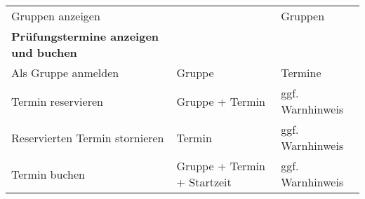 \documentclass[]{article}
\begin{document}
\begin{longtable}[]{@{}lll@{}}
\begin{minipage}[t]{0.40\columnwidth}
Gruppen anzeigen\strut
\end{minipage} & \begin{minipage}[t]{0.27\columnwidth}\raggedright
\strut
\end{minipage} & \begin{minipage}[t]{0.24\columnwidth}\raggedright
Gruppen\strut
\end{minipage}\tabularnewline
\begin{minipage}[t]{0.40\columnwidth}\raggedright
\textbf{Prüfungstermine anzeigen und buchen}\strut
\end{minipage} & \begin{minipage}[t]{0.27\columnwidth}\raggedright
\strut
\end{minipage} & \begin{minipage}[t]{0.24\columnwidth}\raggedright
\strut
\end{minipage}\tabularnewline
\begin{minipage}[t]{0.40\columnwidth}\raggedright
Als Gruppe anmelden\strut
\end{minipage} & \begin{minipage}[t]{0.27\columnwidth}\raggedright
Gruppe\strut
\end{minipage} & \begin{minipage}[t]{0.24\columnwidth}\raggedright
Termine\strut
\end{minipage}\tabularnewline
\begin{minipage}[t]{0.40\columnwidth}\raggedright
Termin reservieren\strut
\end{minipage} & \begin{minipage}[t]{0.27\columnwidth}\raggedright
Gruppe + Termin\strut
\end{minipage} & \begin{minipage}[t]{0.24\columnwidth}\raggedright
ggf. Warnhinweis\strut
\end{minipage}\tabularnewline
\begin{minipage}[t]{0.40\columnwidth}\raggedright
Reservierten Termin stornieren\strut
\end{minipage} & \begin{minipage}[t]{0.27\columnwidth}\raggedright
Termin\strut
\end{minipage} & \begin{minipage}[t]{0.24\columnwidth}\raggedright
ggf. Warnhinweis\strut
\end{minipage}\tabularnewline
\begin{minipage}[t]{0.40\columnwidth}\raggedright
Termin buchen\strut
\end{minipage} & \begin{minipage}[t]{0.27\columnwidth}\raggedright
Gruppe + Termin + Startzeit\strut
\end{minipage} & \begin{minipage}[t]{0.24\columnwidth}\raggedright
ggf. Warnhinweis\strut
\end{minipage}\tabularnewline
\bottomrule
\end{longtable}
\end{document}
